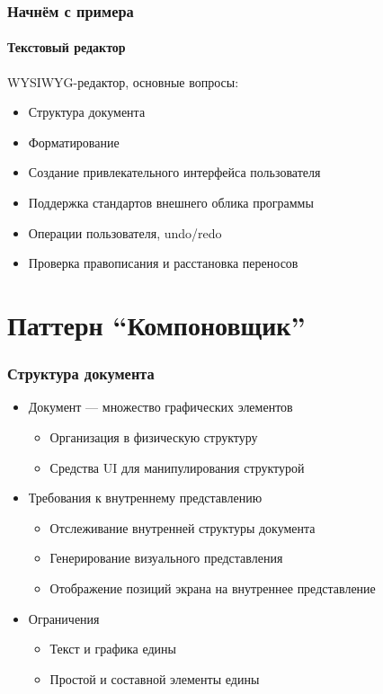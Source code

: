 \documentclass{../cscslides}
\begin{document}
    \begin{frame}
        \frametitle{Начнём с примера}
        \framesubtitle{Текстовый редактор}
        WYSIWYG-редактор, основные вопросы:
        \begin{itemize}
            \item Структура документа
            \item Форматирование
            \item Создание привлекательного интерфейса пользователя
            \item Поддержка стандартов внешнего облика программы
            \item Операции пользователя, undo/redo
            \item Проверка правописания и расстановка переносов
        \end{itemize}
    \end{frame}

    \section{Паттерн ``Компоновщик''}

    \begin{frame}
        \frametitle{Структура документа}
        \begin{itemize}
            \item Документ --- множество графических элементов
            \begin{itemize}
                \item Организация в физическую структуру
                \item Средства UI для манипулирования структурой
            \end{itemize}
            \item Требования к внутреннему представлению
            \begin{itemize}
                \item Отслеживание внутренней структуры документа
                \item Генерирование визуального представления
                \item Отображение позиций экрана на внутреннее представление
            \end{itemize}
            \item Ограничения
            \begin{itemize}
                \item Текст и графика едины
                \item Простой и составной элементы едины
            \end{itemize}
        \end{itemize}
    \end{frame}
\end{document}
